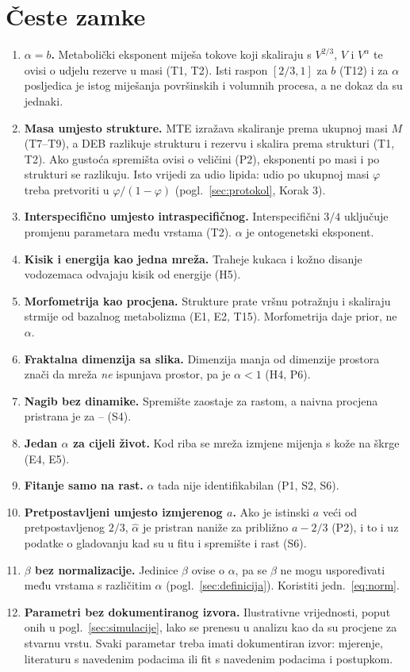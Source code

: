 \section{Česte zamke}\label{sec:zamke}

\begin{enumerate}[leftmargin=1.6em]
\item \textbf{$\alpha=b$.} Metabolički eksponent miješa tokove koji skaliraju s $V^{2/3}$, $V$ i $V^{\alpha}$ te ovisi o udjelu rezerve u masi (T1, T2). Isti raspon $[2/3,1]$ za $b$ (T12) i za $\alpha$ posljedica je istog miješanja površinskih i volumnih procesa, a ne dokaz da su jednaki.
\item \textbf{Masa umjesto strukture.} MTE izražava skaliranje prema ukupnoj masi $M$ (T7–T9), a DEB razlikuje strukturu i rezervu i skalira prema strukturi (T1, T2). Ako gustoća spremišta ovisi o veličini (P2), eksponenti po masi i po strukturi se razlikuju. Isto vrijedi za udio lipida: udio po ukupnoj masi $\varphi$ treba pretvoriti u $\varphi/(1-\varphi)$ (pogl.~\ref{sec:protokol}, Korak 3).
\item \textbf{Interspecifično umjesto intraspecifičnog.} Interspecifični $3/4$ uključuje promjenu parametara među vrstama (T2). $\alpha$ je ontogenetski eksponent.
\item \textbf{Kisik i energija kao jedna mreža.} Traheje kukaca i kožno disanje vodozemaca odvajaju kisik od energije (H5).
\item \textbf{Morfometrija kao procjena.} Strukture prate vršnu potražnju i skaliraju strmije od bazalnog metabolizma (E1, E2, T15). Morfometrija daje prior, ne $\alpha$.
\item \textbf{Fraktalna dimenzija sa slika.} Dimenzija manja od dimenzije prostora znači da mreža \emph{ne} ispunjava prostor, pa je $\alpha<1$ (H4, P6).
\item \textbf{Nagib bez dinamike.} Spremište zaostaje za rastom, a naivna procjena pristrana je za \NaiveBiasMin–\NaiveBiasMax{} (S4).
\item \textbf{Jedan $\alpha$ za cijeli život.} Kod riba se mreža izmjene mijenja s kože na škrge (E4, E5).
\item \textbf{Fitanje samo na rast.} $\alpha$ tada nije identifikabilan (P1, S2, S6).
\item \textbf{Pretpostavljeni umjesto izmjerenog $a$.} Ako je istinski $a$ veći od pretpostavljenog $2/3$, $\hat\alpha$ je pristran naniže za približno $a-2/3$ (P2), i to i uz podatke o gladovanju kad su u fitu i spremište i rast (S6).
\item \textbf{$\beta$ bez normalizacije.} Jedinice $\beta$ ovise o $\alpha$, pa se $\beta$ ne mogu uspoređivati među vrstama s različitim $\alpha$ (pogl.~\ref{sec:definicija}). Koristiti jedn.~\eqref{eq:norm}.
\item \textbf{Parametri bez dokumentiranog izvora.} Ilustrativne vrijednosti, poput onih u pogl.~\ref{sec:simulacije}, lako se prenesu u analizu kao da su procjene za stvarnu vrstu. Svaki parametar treba imati dokumentiran izvor: mjerenje, literaturu s navedenim podacima ili fit s navedenim podacima i postupkom.
\end{enumerate}
